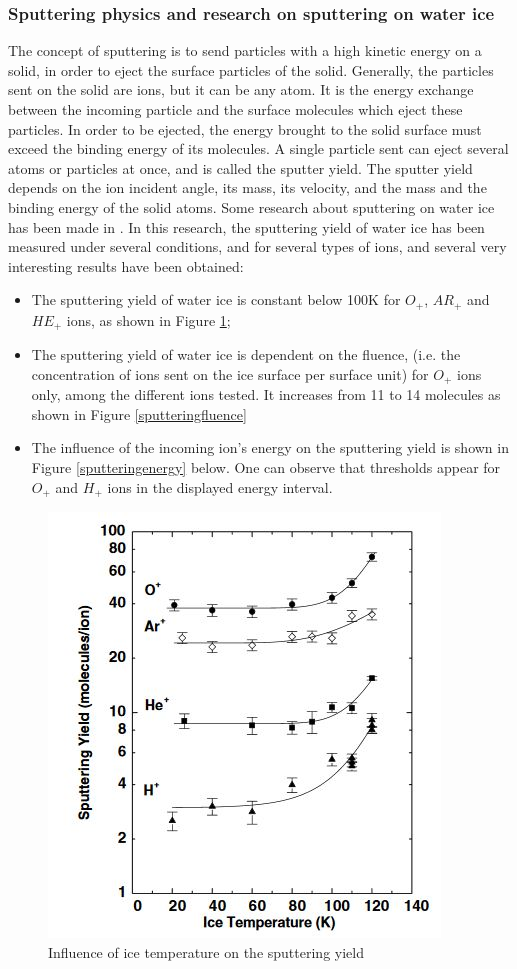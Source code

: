 
\subsubsection{Sputtering physics and research on sputtering on water ice}

The concept of sputtering is to send particles with a high kinetic energy on a solid, in order to eject the surface particles of the solid. Generally, the particles sent on the solid are ions, but it can be any atom. It is the energy exchange between the incoming particle and the surface molecules which eject these particles. In order to be ejected, the energy brought to the solid surface must exceed the binding energy of its molecules. A single particle sent can eject several atoms or particles at once, and is called the sputter yield. The sputter yield depends on the ion incident angle, its mass, its velocity, and the mass and the binding energy of the solid atoms. Some research about sputtering on water ice has been made in \cite{baragiola2003sputtering}.
In this research, the sputtering yield of water ice has been measured under several conditions, and for several types of ions, and several very interesting results have been obtained:

\begin{itemize}
    \item{The sputtering yield of water ice is constant below 100K for $O_{+}$, $AR_{+}$ and $HE_{+}$ ions, as shown in Figure \ref{sputtering30kev};}
    
    \item{The sputtering yield of water ice is dependent on the fluence, (i.e. the concentration of ions sent on the ice surface per surface unit) for $O_{+}$ ions only, among the different ions tested. It increases from 11 to 14 molecules as shown in Figure \ref{sputteringfluence}}

    \item{The influence of the incoming ion's energy on the sputtering yield is shown in Figure \ref{sputteringenergy} below. One can observe that thresholds appear for $O_{+}$ and $H_{+}$ ions in the displayed energy interval.}
\end{itemize}
    
\begin{figure}[htb]
\centering
\includegraphics[width=.48\textwidth]{figures/Paul/sputtering30kev}
\caption{Influence of ice temperature on the sputtering yield}
\label{sputtering30kev}
\end{figure}
    
